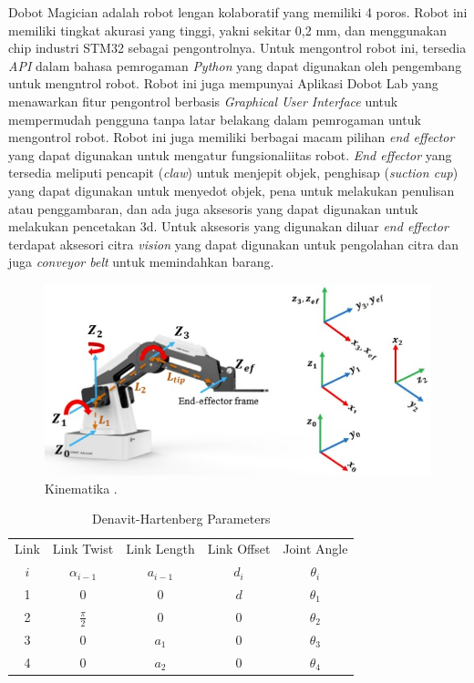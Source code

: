Dobot Magician adalah robot lengan kolaboratif yang memiliki 4 poros. Robot ini memiliki tingkat akurasi yang tinggi, yakni sekitar 0,2 mm, dan menggunakan chip industri STM32 sebagai pengontrolnya. Untuk mengontrol robot ini, tersedia \emph{API} dalam bahasa pemrogaman \emph{Python} yang dapat digunakan oleh pengembang untuk mengntrol robot. Robot ini juga mempunyai Aplikasi Dobot Lab yang menawarkan fitur pengontrol berbasis \emph{Graphical User Interface} untuk mempermudah pengguna tanpa latar belakang dalam pemrogaman untuk mengontrol robot. Robot ini juga memiliki berbagai macam pilihan \emph{end effector} yang dapat digunakan untuk mengatur fungsionaliitas robot. \emph{End effector} yang tersedia meliputi pencapit (\emph{claw}) untuk menjepit objek, penghisap (\emph{suction cup}) yang dapat digunakan untuk menyedot objek, pena untuk melakukan penulisan atau penggambaran, dan ada juga aksesoris yang dapat digunakan untuk melakukan pencetakan 3d. Untuk aksesoris yang digunakan diluar \emph{end effector} terdapat aksesori citra \emph{vision} yang dapat digunakan untuk pengolahan citra dan juga \emph{conveyor belt} untuk memindahkan barang.

\begin{figure}[H]
  \centering

  \includegraphics[scale=0.9]{gambar/kinem.jpg}

  \caption{Kinematika \parencite{inproceedings}.}
  \label{fig:roketluarangkasa}
\end{figure}


  \begin{table}[h]
    \centering
    \begin{tabular}{|c|c|c|c|c|}
        \hline
        Link & Link Twist & Link Length & Link Offset & Joint Angle \\
        $i$ & $\alpha_{i-1}$ & $a_{i-1}$ & $d_i$ & $\theta_i$ \\
        \hline
        1 & 0 & 0 & $d$ & $\theta_1$ \\
        2 & $\frac{\pi}{2}$ & 0 & 0 & $\theta_2$ \\
        3 & 0 & $a_1$ & 0 & $\theta_3$ \\
        4 & 0 & $a_2$ & 0 & $\theta_4$ \\
        \hline
    \end{tabular}
    \caption{Denavit-Hartenberg Parameters}
    \label{tab:dh-parameters}
\end{table}

